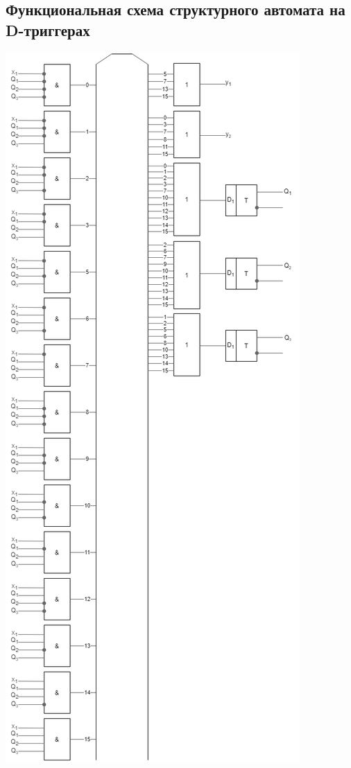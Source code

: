 \documentclass[12pt, a4paper]{article}
\begin{document}
\subsection*{Функциональная схема структурного автомата на D-триггерах}

\begin{center}
  \includegraphics[scale=0.5]{d-trigger.png}
\end{center}
\end{document}
